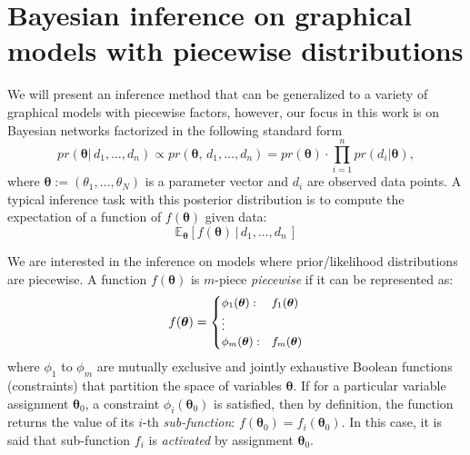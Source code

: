 \section{Bayesian inference on graphical models with piecewise distributions}
\label{sec:inference_piecewise_models}
 We will present an inference method that can be generalized to  
a variety of graphical models with piecewise factors, however, our focus in this
work is on Bayesian networks factorized in the following
standard form 
\begin{equation}
\label{e:posterior}
pr(\boldsymbol\theta | \, d_1, \ldots, d_n) 
\propto
pr(\boldsymbol\theta, \, d_1, \ldots, d_n) 
= pr(\boldsymbol\theta) \cdot \prod_{i=1}^{n} pr(d_i | \boldsymbol\theta) , 
\end{equation} 
where $\boldsymbol\theta := (\theta_1, \ldots, \theta_N)$ is a parameter vector and $d_i$ are observed data points. 
A typical inference task %
with this posterior distribution is to compute the expectation of a function of $f(\boldsymbol\theta)$ given data:
\begin{equation}
\label{e:prob.outcome}
\mathbb{E}_{\boldsymbol\theta}[f(\boldsymbol\theta) \,|\, d_1, \ldots, d_n \,]
\end{equation}


We are interested in the inference on models where prior/likelihood distributions are piecewise.
A function $f(\boldsymbol{\theta})$ is $m$-piece \emph{piecewise} if it can be represented as:
\begin{equation}
\label{e:piecewise}
f(\boldsymbol{\theta}) = 
{\footnotesize
\begin{cases}
\phi_1(\boldsymbol{\theta}) : & f_1(\boldsymbol{\theta})\\
\vdots\\
\phi_m(\boldsymbol{\theta}) : & f_m(\boldsymbol{\theta})
\end{cases}
}%
\end{equation}
where $\phi_1$ to $\phi_m$ are mutually exclusive and jointly exhaustive Boolean functions (constraints) 
that partition the space of variables $\boldsymbol{\theta}$. If for a particular variable assignment $\boldsymbol{\theta}_0$, a constraint $\phi_i(\boldsymbol{\theta}_0)$ is satisfied, then by definition, the function returns the value of its $i$-th \emph{sub-function}: $f(\boldsymbol{\theta}_0) = f_i(\boldsymbol{\theta}_0)$.  
In this case, it is said that sub-function $f_i$ is \emph{activated} by assignment $\boldsymbol{\theta}_0$.


